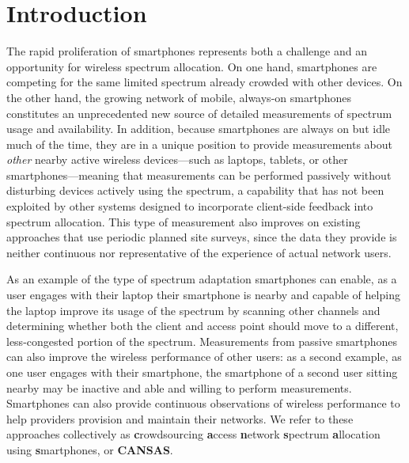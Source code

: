 \section{Introduction}

The rapid proliferation of smartphones represents both a challenge and an
opportunity for wireless spectrum allocation. On one hand, smartphones are
competing for the same limited spectrum already crowded with other devices.
On the other hand, the growing network of mobile, always-on smartphones
constitutes an unprecedented new source of detailed measurements of spectrum
usage and availability. In addition, because smartphones are always on but
idle much of the time, they are in a unique position to provide measurements
about \textit{other} nearby active wireless devices---such as laptops,
tablets, or other smartphones---meaning that measurements can be performed
passively without disturbing devices actively using the spectrum, a
capability that has not been exploited by other systems designed to
incorporate client-side feedback into spectrum allocation. This type of
measurement also improves on existing approaches that use periodic planned
site surveys, since the data they provide is neither continuous nor
representative of the experience of actual network users.

As an example of the type of spectrum adaptation smartphones can enable, as a
user engages with their laptop their smartphone is nearby and capable of
helping the laptop improve its usage of the spectrum by scanning other
channels and determining whether both the client and access point should move
to a different, less-congested portion of the spectrum. Measurements from
passive smartphones can also improve the wireless performance of other users:
as a second example, as one user engages with their smartphone, the
smartphone of a second user sitting nearby may be inactive and able and
willing to perform measurements. Smartphones can also provide continuous
observations of wireless performance to help providers provision and maintain
their networks. We refer to these approaches collectively as
\textbf{c}rowdsourcing \textbf{a}ccess \textbf{n}etwork \textbf{s}pectrum
\textbf{a}llocation using \textbf{s}martphones, or \textbf{CANSAS}.

